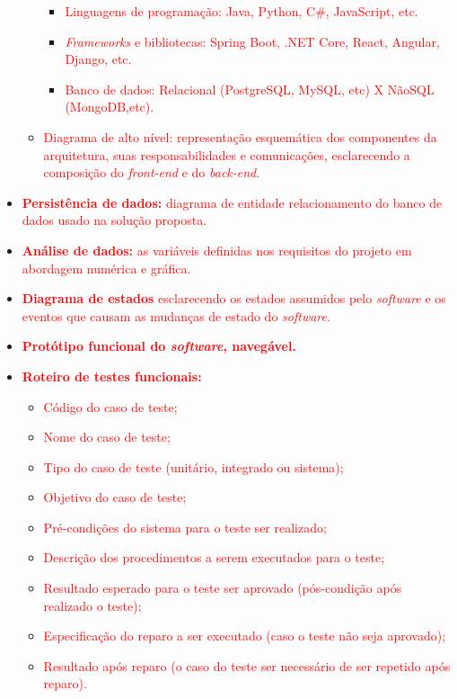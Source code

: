 \begin{itemize}
\begin{itemize}
\begin{itemize}
            \item \textcolor{red}{ Linguagens de programação: Java, Python, C\#, JavaScript, etc.}
            \item \textcolor{red}{ \textit{Frameworks} e bibliotecas: Spring Boot, .NET Core, React, Angular, Django, etc.}
            \item \textcolor{red}{ Banco de dados: Relacional (PostgreSQL, MySQL, etc) X NãoSQL (MongoDB,etc). }
        \end{itemize}
        \item \textcolor{red}{ Diagrama de alto nível: representação esquemática dos componentes da arquitetura, suas responsabilidades e comunicações, esclarecendo a composição do \textit{front-end} e do \textit{back-end}.}
    \end{itemize}
    \item \textcolor{red}{ \textbf{Persistência de dados:} diagrama de entidade relacionamento do banco de dados usado na solução proposta.}
    \item \textcolor{red}{ \textbf{Análise de dados:} as variáveis definidas nos requisitos do projeto em abordagem numérica e gráfica.}
    \item \textcolor{red}{ \textbf{Diagrama de estados} esclarecendo os estados assumidos pelo \textit{software} e os eventos que causam as mudanças de estado do \textit{software}.}
    \item \textcolor{red}{ \textbf{Protótipo funcional do \textit{software}, navegável.}}
    \item \textcolor{red}{\textbf{ Roteiro de testes funcionais:} }
    \begin{itemize}
        \item \textcolor{red}{Código do caso de teste;}
        \item \textcolor{red}{Nome do caso de teste;}
        \item \textcolor{red}{Tipo do caso de teste (unitário, integrado ou sistema);}
        \item \textcolor{red}{ Objetivo do caso de teste;}
        \item \textcolor{red}{ Pré-condições do sistema para o teste ser realizado;}
        \item \textcolor{red}{ Descrição dos procedimentos a serem executados para o teste;}
        \item \textcolor{red}{ Resultado esperado para o teste ser aprovado (pós-condição após realizado o teste);}
        \item \textcolor{red}{ Especificação do reparo a ser executado (caso o teste não seja aprovado);}
        \item \textcolor{red}{ Resultado após reparo (o caso do teste ser necessário de ser repetido após reparo).}
    \end{itemize}
\end{itemize}


